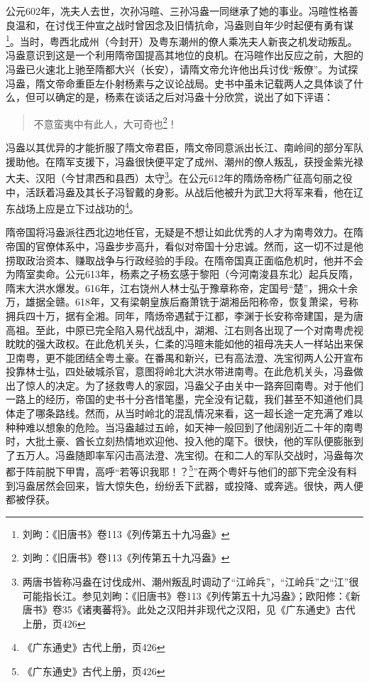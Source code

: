 公元602年，冼夫人去世，次孙冯暄、三孙冯盎一同继承了她的事业。冯暄性格善良温和，在讨伐王仲宣之战时曾因念及旧情抗命，冯盎则自年少时起便有勇有谋\footnote{刘昫：《旧唐书》卷113《列传第五十九冯盎》}。当时，粤西北成州（今封开）及粤东潮州的僚人乘冼夫人新丧之机发动叛乱。冯盎意识到这是一个利用隋帝国提高其地位的良机。在冯暄作出反应之前，大胆的冯盎已火速北上驰至隋都大兴（长安），请隋文帝允许他出兵讨伐“叛僚”。为试探冯盎，隋文帝命重臣左仆射杨素与之议论战局。史书中虽未记载两人之具体谈了什么，但可以确定的是，杨素在谈话之后对冯盎十分欣赏，说出了如下评语：

\begin{quote}
	不意蛮夷中有此人，大可奇也\footnote{刘昫：《旧唐书》卷113《列传第五十九冯盎》}！
\end{quote}

冯盎以其优异的才能折服了隋文帝君臣，隋文帝同意派出长江、南岭间的部分军队援助他。在隋军支援下，冯盎很快便平定了成州、潮州的僚人叛乱，获授金紫光禄大夫、汉阳（今甘肃西和县西）太守\footnote{两唐书皆称冯盎在讨伐成州、潮州叛乱时调动了“江岭兵”，“江岭兵”之“江”很可能指长江。参见刘昫：《旧唐书》卷113《列传第五十九冯盎》；欧阳修：《新唐书》卷35《诸夷蕃将》。此处之汉阳并非现代之汉阳，见《广东通史》古代上册，页426}。在公元612年的隋炀帝杨广征高句丽之役中，活跃着冯盎及其长子冯智戴的身影。从战后他被升为武卫大将军来看，他在辽东战场上应是立下过战功的\footnote{《广东通史》古代上册，页426}。

隋帝国将冯盎派往西北边地任官，无疑是不想让如此优秀的人才为南粤效力。在隋帝国的官僚体系中，冯盎步步高升，看似对帝国十分忠诚。然而，这一切不过是他捞取政治资本、赚取战争与行政经验的手段。在隋帝国真正面临危机时，他并不会为隋室卖命。公元613年，杨素之子杨玄感于黎阳（今河南浚县东北）起兵反隋，隋末大洪水爆发。616年，江右饶州人林士弘于豫章称帝，定国号“楚”，拥众十余万，雄据全赣。618年，又有梁朝皇族后裔萧铣于湖湘岳阳称帝，恢复萧梁，号称拥兵四十万，据有全湘。同年，隋炀帝遇弑于江都，李渊于长安称帝建国，是为唐高祖。至此，中原已完全陷入易代战乱中，湖湘、江右则各出现了一个对南粤虎视眈眈的强大政权。在此危机关头，仁柔的冯暄未能如他的祖母冼夫人一样站出来保卫南粤，更不能团结全粤土豪。在番禺和新兴，已有高法澄、冼宝彻两人公开宣布投靠林士弘，四处破城杀官，意图将岭北大洪水带进南粤。在此危机关头，冯盎做出了惊人的决定。为了拯救粤人的家园，冯盎父子由关中一路奔回南粤。对于他们一路上的经历，帝国的史书十分吝惜笔墨，完全没有记载，我们甚至不知道他们具体走了哪条路线。然而，从当时岭北的混乱情况来看，这一超长途一定充满了难以种种难以想象的危险。当冯盎越过五岭，如天神一般回到了他阔别近二十年的南粤时，大批土豪、酋长立刻热情地欢迎他、投入他的麾下。很快，他的军队便膨胀到了五万人。冯盎随即率军闪击高法澄、冼宝彻。在和二人的军队交战时，冯盎每次都于阵前脱下甲胄，高呼“若等识我耶！？\footnote{《广东通史》古代上册，页426}”在两个粤奸与他们的部下完全没有料到冯盎居然会回来，皆大惊失色，纷纷丢下武器，或投降、或奔逃。很快，两人便都被俘获。

